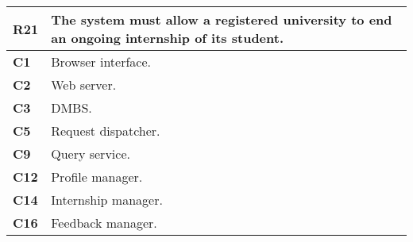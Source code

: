 \begin{table}[H]
    \centering
    \begin{tabular}{|l|m{10cm}|}
        \hline \textbf{R21} & The system must allow a registered university to end an ongoing internship of its student.\\
        \hline \textbf{C1} & Browser interface. \\
        \hline \textbf{C2} & Web server. \\
        \hline \textbf{C3} & DMBS. \\
        \hline \textbf{C5} & Request dispatcher. \\
        \hline \textbf{C9} & Query service. \\
        \hline \textbf{C12} & Profile manager.\\
        \hline \textbf{C14} & Internship manager. \\
        \hline \textbf{C16} & Feedback manager. \\
        \hline
    \end{tabular}
\end{table}

